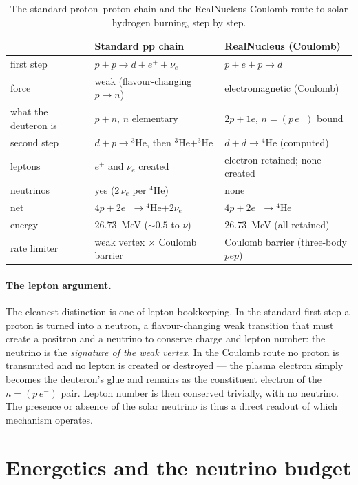 \documentclass[11pt]{article}
\begin{document}
\begin{table}[h]
\centering
\renewcommand{\arraystretch}{1.25}
\begin{tabular}{lll}
\toprule
 & \textbf{Standard pp chain} & \textbf{RealNucleus (Coulomb)}\\
\midrule
first step        & $p+p\to d+e^{+}+\nu_e$      & $p+e+p\to d$\\
force             & weak (flavour-changing $p\to n$) & electromagnetic (Coulomb)\\
what the deuteron is & $p+n$, $n$ elementary     & $2p+1e$, $n=(p\,e^-)$ bound\\
second step       & $d+p\to{}^3$He, then ${}^3$He$+{}^3$He & $d+d\to{}^4$He (computed)\\
leptons           & $e^{+}$ and $\nu_e$ created   & electron retained; none created\\
neutrinos         & yes ($2\,\nu_e$ per $^4$He)  & none\\
net               & $4p+2e^-\to{}^4$He$+2\nu_e$   & $4p+2e^-\to{}^4$He\\
energy            & $26.73$~MeV ($\sim0.5$ to $\nu$) & $26.73$~MeV (all retained)\\
rate limiter      & weak vertex $\times$ Coulomb barrier & Coulomb barrier (three-body $p e p$)\\
\bottomrule
\end{tabular}
\caption{The standard proton--proton chain and the RealNucleus Coulomb route to solar hydrogen
burning, step by step.}
\label{tab:compare}
\end{table}

\paragraph{The lepton argument.} The cleanest distinction is one of lepton bookkeeping. In the standard
first step a proton is turned into a neutron, a flavour-changing weak transition that must create a
positron and a neutrino to conserve charge and lepton number: the neutrino is the \emph{signature of
the weak vertex}. In the Coulomb route no proton is transmuted and no lepton is created or destroyed
--- the plasma electron simply becomes the deuteron's glue and remains as the constituent electron of
the $n=(p\,e^-)$ pair. Lepton number is then conserved trivially, with no neutrino. The presence or
absence of the solar neutrino is thus a direct readout of which mechanism operates.

\section{Energetics and the neutrino budget}
\end{document}
